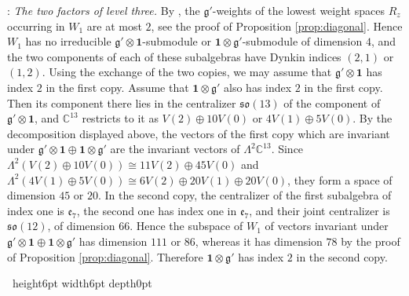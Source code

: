\documentclass[leqno]{article}
\newcommand{\Cbb}{\ensuremath{\mathbb{C}}}
\newcommand{\qed}{\hfill \vrule height6pt  width6pt depth0pt}
\newcommand{\ot}{\otimes}
\newenvironment{proof}[1][]{\noindent {\it Proof #1} : }{\hbox{~}\qed
\smallskip
}
\numberwithin{equation}{section}
\begin{document}
\begin{proof}
\emph{The two factors of level three.} By \cite[Theorem 8.5 and Table 2]{Arh26}, the $\mathfrak g'$-weights of the lowest weight spaces $R_z$ occurring in $W_1$ are at most $2$, see the proof of Proposition \ref{prop:diagonal}. Hence $W_1$ has no irreducible $\mathfrak g' \ot \mathbf 1$-submodule or $\mathbf 1 \ot \mathfrak g'$-submodule of dimension $4$, and the two components of each of these subalgebras have Dynkin indices $(2,1)$ or $(1,2)$. Using the exchange of the two copies, we may assume that $\mathfrak g' \ot \mathbf 1$ has index $2$ in the first copy. Assume that $\mathbf 1 \ot \mathfrak g'$ also has index $2$ in the first copy. Then its component there lies in the centralizer $\mathfrak{so}(13)$ of the component of $\mathfrak g' \ot \mathbf 1$, and $\Cbb^{13}$ restricts to it as $V(2) \oplus 10V(0)$ or $4V(1) \oplus 5V(0)$. By the decomposition displayed above, the vectors of the first copy which are invariant under $\mathfrak g' \ot \mathbf 1 \oplus \mathbf 1 \ot \mathfrak g'$ are the invariant vectors of $\Lambda^2\Cbb^{13}$. Since $\Lambda^2(V(2) \oplus 10V(0)) \cong 11V(2) \oplus 45V(0)$ and $\Lambda^2(4V(1) \oplus 5V(0)) \cong 6V(2) \oplus 20V(1) \oplus 20V(0)$, they form a space of dimension $45$ or $20$. In the second copy, the centralizer of the first subalgebra of index one is $\mathfrak e_7$, the second one has index one in $\mathfrak e_7$, and their joint centralizer is $\mathfrak{so}(12)$, of dimension $66$. Hence the subspace of $W_1$ of vectors invariant under $\mathfrak g' \ot \mathbf 1 \oplus \mathbf 1 \ot \mathfrak g'$ has dimension $111$ or $86$, whereas it has dimension $78$ by the proof of Proposition \ref{prop:diagonal}. Therefore $\mathbf 1 \ot \mathfrak g'$ has index $2$ in the second copy.


\end{proof}
\end{document}
